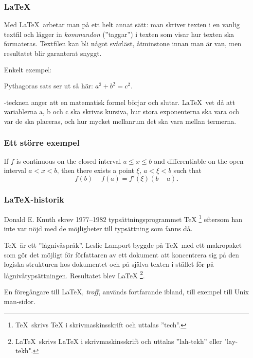 \begin{frame}[fragile=singleslide]
\frametitle{\LaTeX}
Med \LaTeX\ arbetar man på ett helt annat sätt: man skriver 
texten i en vanlig textfil och lägger
in \emph{kommandon} (''taggar'')  i texten som visar hur texten ska
formateras. Textfilen kan bli något svårläst, åtminstone innan man är van, men resultatet blir garanterat snyggt.

\blankline
Enkelt exempel:

\begin{exempel}
Pythagoras sats ser ut så
här: $a^2 + b^2 = c^2$.
\end{exempel} 

\code{\$}-tecknen anger att en matematisk formel börjar och slutar. 
\LaTeX\ vet då att variablerna a, b och c ska skrivas kursiva, hur stora
exponenterna ska vara och var de ska placeras, och hur
mycket mellanrum det ska vara mellan termerna.

\end{frame} 

\begin{frame}[fragile=singleslide]
\frametitle{Ett större exempel}
\begin{mexempel}
   If $f$ is continuous on the
   closed interval $a \leq x \leq b$
   and differentiable on the open
   interval $a < x < b$, then there
   exists a point
   $\xi$, $a < \xi < b$ such that
   \begin{displaymath}
      f(b) - f(a) = f'(\xi)(b -a).
   \end{displaymath}
\end{mexempel}

\end{frame} 

\begin{frame}[fragile=singleslide]
\frametitle{\LaTeX-historik}
Donald E. Knuth skrev 1977--1982 typsättningsprogrammet \TeX
\footnote{\TeX\ skrivs TeX i skrivmaskinsskrift och uttalas
''tech''.} 
eftersom han inte var nöjd med de möjligheter till typsättning
som fanns då.

\TeX\ är ett ''lågnivåspråk''. Leslie Lamport byggde på \TeX\ 
med ett makropaket som gör det möjligt för författaren av ett
dokument att koncentrera sig på den logiska strukturen hos
dokumentet och på själva texten i stället för på lågnivåtypsättningen. 
Resultatet
blev \LaTeX
\footnote{\LaTeX\ skrivs LaTeX i skrivmaskinsskrift och uttalas
''lah-tekh'' eller "lay-tekh".}.

En föregångare till \LaTeX, \emph{troff}, används fortfarande
ibland, till exempel till Unix man-sidor.
\end{frame} 

